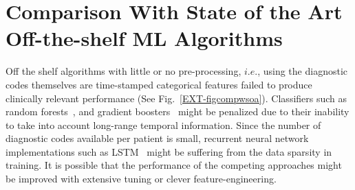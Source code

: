 \documentclass[3p,super,numbers,sort&compress,preprint,10pt]{elsarticle}
\renewcommand{\captionN}[1]{\caption{\color{CadetBlue4!80!black} \sffamily \fontsize{9}{10}\selectfont #1  }}
\def\MXCOL{black}
\begin{document}
\else
{}\label{EXT-figcompsi}
\fi






\tikzexternalenable
\section{Comparison With State of the Art Off-the-shelf ML Algorithms}\label{sec:offtheshelf}
    
% 

Off the shelf algorithms with little or no pre-processing, $i.e.$, using the diagnostic codes themselves are time-stamped categorical features failed to produce clinically relevant performance (See Fig.~\ref{EXT-figcompwsoa}). Classifiers such as random forests~\cite{Breiman}, and gradient boosters~\cite{Friedman} might be penalized due to their inability to take into account long-range temporal information. Since the number of diagnostic codes available per patient is small, recurrent neural network implementations such as LSTM~\cite{Hochreiter} might be suffering from the data sparsity in training. It is possible that the performance of the competing approaches might be improved with extensive tuning or clever feature-engineering.
  
\end{document}
